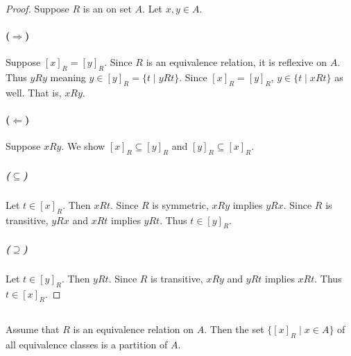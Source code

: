 \documentclass{report}
\begin{document}
\begin{proof}

  Suppose $R$ is an  on set $A$.
  Let $x, y \in A$.

  \paragraph{($\Rightarrow$)}%

    Suppose $[x]_R = [y]_R$.
    Since $R$ is an equivalence relation, it is reflexive on $A$.
    Thus $yRy$ meaning $y \in [y]_R = \{t \mid yRt\}$.
    Since $[x]_R = [y]_R$, $y \in \{t \mid xRt\}$ as well.
    That is, $xRy$.

  \paragraph{($\Leftarrow$)}%

    Suppose $xRy$.
    We show $[x]_R \subseteq [y]_R$ and $[y]_R \subseteq [x]_R$.

    \subparagraph{($\subseteq$)}%

      Let $t \in [x]_R$.
      Then $xRt$.
      Since $R$ is symmetric, $xRy$ implies $yRx$.
      Since $R$ is transitive, $yRx$ and $xRt$ implies $yRt$.
      Thus $t \in [y]_R$.

    \subparagraph{($\supseteq$)}%

      Let $t \in [y]_R$.
      Then $yRt$.
      Since $R$ is transitive, $xRy$ and $yRt$ implies $xRt$.
      Thus $t \in [x]_R$.

\end{proof}

\subsection{}%
\label{sub:theorem-3p}

\begin{theorem}[3P]

  Assume that $R$ is an equivalence relation on $A$.
  Then the set $\{[x]_R \mid x \in A\}$ of all equivalence classes is a
    partition of $A$.

\end{theorem}
\end{document}
